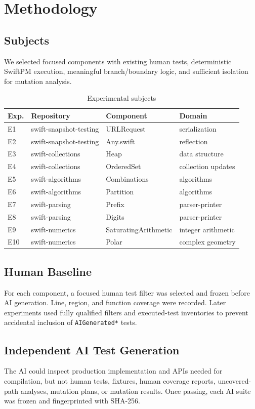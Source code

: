 \documentclass[10pt,conference]{IEEEtran}
\begin{document}
\section{Methodology}

\subsection{Subjects}
We selected focused components with existing human tests, deterministic SwiftPM execution, meaningful branch/boundary logic, and sufficient isolation for mutation analysis.

\begin{table}[ht]
\centering
\caption{Experimental subjects}
\label{tab:subjects}
\small
\begin{tabular}{llll}
\toprule
Exp. & Repository & Component & Domain \\
\midrule
E1 & swift-snapshot-testing & URLRequest & serialization \\
E2 & swift-snapshot-testing & Any.swift & reflection \\
E3 & swift-collections & Heap & data structure \\
E4 & swift-collections & OrderedSet & collection updates \\
E5 & swift-algorithms & Combinations & algorithms \\
E6 & swift-algorithms & Partition & algorithms \\
E7 & swift-parsing & Prefix & parser-printer \\
E8 & swift-parsing & Digits & parser-printer \\
E9 & swift-numerics & SaturatingArithmetic & integer arithmetic \\
E10 & swift-numerics & Polar & complex geometry \\
\bottomrule
\end{tabular}
\end{table}

\subsection{Human Baseline}
For each component, a focused human test filter was selected and frozen before AI generation. Line, region, and function coverage were recorded. Later experiments used fully qualified filters and executed-test inventories to prevent accidental inclusion of \texttt{AIGenerated*} tests.

\subsection{Independent AI Test Generation}
The AI could inspect production implementation and APIs needed for compilation, but not human tests, fixtures, human coverage reports, uncovered-path analyses, mutation plans, or mutation results. Once passing, each AI suite was frozen and fingerprinted with SHA-256.
\end{document}
